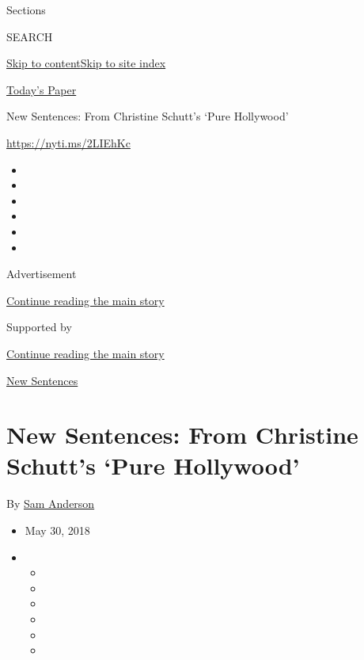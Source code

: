 Sections

SEARCH

\protect\hyperlink{site-content}{Skip to
content}\protect\hyperlink{site-index}{Skip to site index}

\href{https://myaccount.nytimes3xbfgragh.onion/auth/login?response_type=cookie\&client_id=vi}{}

\href{https://www.nytimes3xbfgragh.onion/section/todayspaper}{Today's
Paper}

New Sentences: From Christine Schutt's `Pure Hollywood'

\url{https://nyti.ms/2LIEhKc}

\begin{itemize}
\item
\item
\item
\item
\item
\item
\end{itemize}

Advertisement

\protect\hyperlink{after-top}{Continue reading the main story}

Supported by

\protect\hyperlink{after-sponsor}{Continue reading the main story}

\href{/column/new-sentences}{New Sentences}

\hypertarget{new-sentences-from-christine-schutts-pure-hollywood}{%
\section{New Sentences: From Christine Schutt's `Pure
Hollywood'}\label{new-sentences-from-christine-schutts-pure-hollywood}}

By \href{http://www.nytimes3xbfgragh.onion/by/sam-anderson}{Sam
Anderson}

\begin{itemize}
\item
  May 30, 2018
\item
  \begin{itemize}
  \item
  \item
  \item
  \item
  \item
  \item
  \end{itemize}
\end{itemize}

